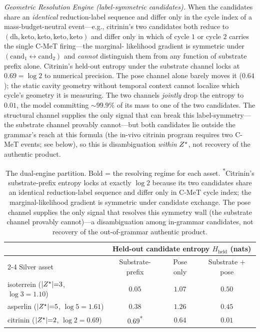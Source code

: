 \emph{Geometric Resolution Engine (label-symmetric candidates).} When the candidates share
an \emph{identical} reduction-label sequence and differ only in the cycle index of a
mass-budget-neutral event---e.g., citrinin's two candidates both reduce to
$(\mathrm{dh},\mathrm{keto},\mathrm{keto},\mathrm{keto},\mathrm{keto})$ and differ only
in which of cycle $1$ or cycle $2$ carries the single C-MeT firing---the marginal-
likelihood gradient is symmetric under $(\text{cand}_1\leftrightarrow\text{cand}_2)$ and
\emph{cannot} distinguish them from any function of substrate prefix alone. Citrinin's
held-out entropy under the substrate channel locks at $0.69 = \log 2$ to numerical
precision. The pose channel alone barely moves it ($0.64$); the static cavity geometry
without temporal context cannot localize which cycle's geometry it is measuring. The
two channels \emph{jointly} drop the entropy to $0.01$, the model committing
${\sim}99.9\%$ of its mass to one of the two candidates. The structural channel supplies the
only signal that can break this label-symmetry---the substrate channel provably cannot---but
both candidates lie outside the grammar's reach at this formula (the in-vivo citrinin program
requires two C-MeT events; see below), so this is disambiguation \emph{within} $Z^{\star}$, not
recovery of the authentic product.

\begin{table}[h]
\centering\small
\begin{tabular}{@{}lccc@{}}
\toprule
& \multicolumn{3}{c}{Held-out candidate entropy $H_{\mathrm{held}}$ (nats)} \\
\cmidrule(lr){2-4}
Silver asset & Substrate-prefix & Pose only & Substrate $+$ pose \\
\midrule
isoterrein ($|Z^{\star}|{=}3$, $\log 3{=}1.10$)   & $\mathbf{0.05}$           & $1.07$ & $0.50$ \\
asperlin   ($|Z^{\star}|{=}5$, $\log 5{=}1.61$)   & $\mathbf{0.38}$           & $1.26$ & $0.45$ \\
citrinin   ($|Z^{\star}|{=}2$, $\log 2{=}0.69$)   & $0.69$\textsuperscript{*} & $0.64$ & $\mathbf{0.01}$ \\
\bottomrule
\end{tabular}
\caption{The dual-engine partition. Bold = the resolving regime for each asset.
\textsuperscript{*}Citrinin's substrate-prefix entropy locks at exactly $\log 2$
because its two candidates share an identical reduction-label sequence and differ
only in C-MeT cycle index; the marginal-likelihood gradient is symmetric under
candidate exchange. The pose channel supplies the only signal that resolves this
symmetry wall (the substrate channel provably cannot)---a disambiguation among
in-grammar candidates, not recovery of the out-of-grammar authentic product.}
\label{tab:rescue}
\end{table}

